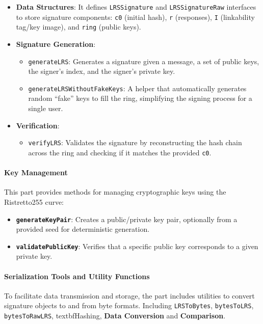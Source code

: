 \documentclass[letterpaper,11pt]{article}
\begin{document}
\begin{itemize}
    \item \textbf{Data Structures}: It defines \texttt{LRSSignature} and \texttt{LRSSignatureRaw} interfaces to store signature components: \texttt{c0} (initial hash), \texttt{r} (responses), \texttt{I} (linkability tag/key image), and \texttt{ring} (public keys).
    \item \textbf{Signature Generation}:
          \begin{itemize}
              \item \texttt{generateLRS}: Generates a signature given a message, a set of public keys, the signer's index, and the signer's private key.
              \item \texttt{generateLRSWithoutFakeKeys}: A helper that automatically generates random ``fake'' keys to fill the ring, simplifying the signing process for a single user.
          \end{itemize}
    \item \textbf{Verification}:
          \begin{itemize}
              \item \texttt{verifyLRS}: Validates the signature by reconstructing the hash chain across the ring and checking if it matches the provided \texttt{c0}.
          \end{itemize}
\end{itemize}

\paragraph{Key Management} This part provides methods for managing cryptographic keys using the Ristretto255 curve:

\begin{itemize}
    \item \textbf{\texttt{generateKeyPair}}: Creates a public/private key pair, optionally from a provided seed for deterministic generation.
    \item \textbf{\texttt{validatePublicKey}}: Verifies that a specific public key corresponds to a given private key.
\end{itemize}

\paragraph{Serialization Tools and Utility Functions}

To facilitate data transmission and storage, the part includes utilities to convert signature objects to and from byte formats. Including \texttt{LRSToBytes}, \texttt{bytesToLRS}, \texttt{bytesToRawLRS}, textbf{Hashing}, \textbf{Data Conversion} and \textbf{Comparison}.
\end{document}
